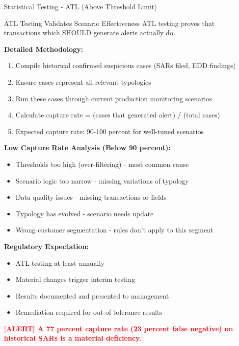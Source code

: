 \documentclass[11pt,a4paper]{beamer}
\newcommand{\redflag}[1]{\textcolor{red}{\textbf{[ALERT] #1}}}
\begin{document}
	\begin{frame}{Statistical Testing - ATL (Above Threshold Limit)}
		\begin{block}{ATL Testing Validates Scenario Effectiveness}
			ATL testing proves that transactions which SHOULD generate alerts actually do.
		\end{block}
		
		\textbf{Detailed Methodology:}
		\begin{enumerate}
			\item Compile historical confirmed suspicious cases (SARs filed, EDD findings)
			\item Ensure cases represent all relevant typologies
			\item Run these cases through current production monitoring scenarios
			\item Calculate capture rate = (cases that generated alert) / (total cases)
			\item Expected capture rate: 90-100 percent for well-tuned scenarios
		\end{enumerate}
		
		\textbf{Low Capture Rate Analysis (Below 90 percent):}
		\begin{itemize}
			\item Thresholds too high (over-filtering) - most common cause
			\item Scenario logic too narrow - missing variations of typology
			\item Data quality issues - missing transactions or fields
			\item Typology has evolved - scenario needs update
			\item Wrong customer segmentation - rules don't apply to this segment
		\end{itemize}
		
		\textbf{Regulatory Expectation:}
		\begin{itemize}
			\item ATL testing at least annually
			\item Material changes trigger interim testing
			\item Results documented and presented to management
			\item Remediation required for out-of-tolerance results
		\end{itemize}
		
		\redflag{A 77 percent capture rate (23 percent false negative) on historical SARs is a material deficiency.}
	\end{frame}
	
\end{document}
